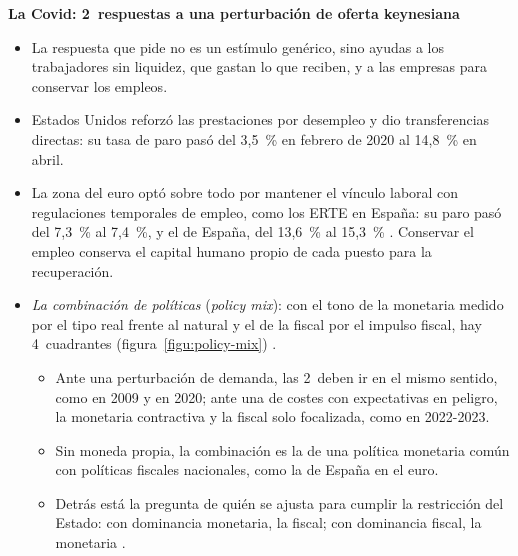 \documentclass[11pt]{article}
\begin{document}
\begin{anotaciones}
\textbf{La Covid: 2~respuestas a una perturbación de oferta keynesiana}
\begin{itemize}
\item La respuesta que pide no es un estímulo genérico, sino ayudas a los trabajadores sin liquidez, que gastan lo que reciben, y a las empresas para conservar los empleos\nocite{GuerrieriEtAl2022}.
\item Estados Unidos reforzó las prestaciones por desempleo y dio transferencias directas: su tasa de paro pasó del 3,5~\% en febrero de 2020 al 14,8~\% en abril\nocite{FRED2026UNRATE}.
\item La zona del euro optó sobre todo por mantener el vínculo laboral con regulaciones temporales de empleo, como los ERTE en España: su paro pasó del 7,3~\% al 7,4~\%, y el de España, del 13,6~\% al 15,3~\%\nocite{Eurostat2026unertm} . Conservar el empleo conserva el capital humano propio de cada puesto para la recuperación.
\end{itemize}
\end{anotaciones}

\begin{itemize}
\item \emph{La combinación de políticas} (\emph{policy mix}): con el tono de la monetaria medido por el tipo real frente al natural y el de la fiscal por el impulso fiscal, hay 4~cuadrantes (figura~\ref{figu:policy-mix}) .
  \begin{itemize}
  \item Ante una perturbación de demanda, las 2~deben ir en el mismo sentido, como en 2009 y en 2020; ante una de costes con expectativas en peligro, la monetaria contractiva y la fiscal solo focalizada, como en 2022-2023.
  \item Sin moneda propia, la combinación es la de una política monetaria común con políticas fiscales nacionales, como la de España en el euro.
  \item Detrás está la pregunta de quién se ajusta para cumplir la restricción del Estado: con dominancia monetaria, la fiscal; con dominancia fiscal, la monetaria\nocite{SargentWallace1981Some,Leeper1991} .
  \end{itemize}
\end{itemize}

\begin{infografia}[H]
\centering
\caption{La combinación de políticas (\emph{policy mix}): los 4~cuadrantes}\label{figu:policy-mix}
\end{infografia}
\end{document}

